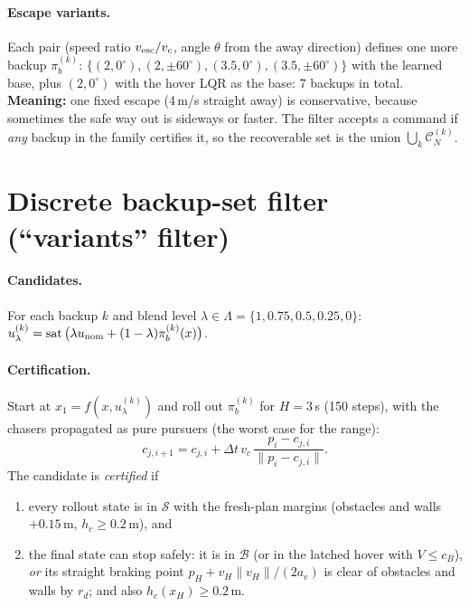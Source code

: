 \documentclass[11pt]{article}
\newcommand{\sat}{\operatorname{sat}}
\newcommand{\Safe}{\mathcal{S}}
\newcommand{\Base}{\mathcal{B}}
\newcommand{\CN}{\mathcal{C}_N}
\begin{document}
\paragraph{Escape variants.} Each pair (speed ratio $v_{\rm esc}/v_c$, angle $\theta$ from the away direction) defines one more backup $\pi_b^{(k)}$:
$\{(2,0^\circ),(2,\pm60^\circ),(3.5,0^\circ),(3.5,\pm60^\circ)\}$ with the learned base, plus $(2,0^\circ)$ with the hover LQR as the base: 7 backups in total.
\textbf{Meaning:} one fixed escape (4\,m/s straight away) is conservative, because sometimes the safe way out is sideways or faster. The filter accepts a command if \emph{any} backup in the family certifies it, so the recoverable set is the union $\bigcup_k\CN^{(k)}$.

\section{Discrete backup-set filter (``variants'' filter)}\label{sec:discrete}

\paragraph{Candidates.} For each backup $k$ and blend level $\lambda\in\Lambda=\{1,0.75,0.5,0.25,0\}$:
$u^{(k)}_\lambda=\sat\big(\lambda u_{\rm nom}+(1-\lambda)\pi_b^{(k)}(x)\big)$.

\paragraph{Certification.} Start at $x_1=f(x,u^{(k)}_\lambda)$ and roll out $\pi_b^{(k)}$ for $H=3$\,s (150 steps), with the chasers propagated as pure pursuers (the worst case for the range):
\begin{equation}
c_{j,i+1}=c_{j,i}+\Delta t\,v_c\,\frac{p_i-c_{j,i}}{\|p_i-c_{j,i}\|}.
\end{equation}
The candidate is \emph{certified} if
\begin{enumerate}
\item every rollout state is in $\Safe$ with the fresh-plan margins (obstacles and walls $+0.15$\,m, $h_c\ge0.2$\,m), and
\item the final state can stop safely: it is in $\Base$ (or in the latched hover with $V\le c_B$), \emph{or} its straight braking point $p_H+v_H\|v_H\|/(2a_e)$ is clear of obstacles and walls by $r_d$; and also $h_c(x_H)\ge0.2$\,m.
\end{enumerate}
\end{document}
